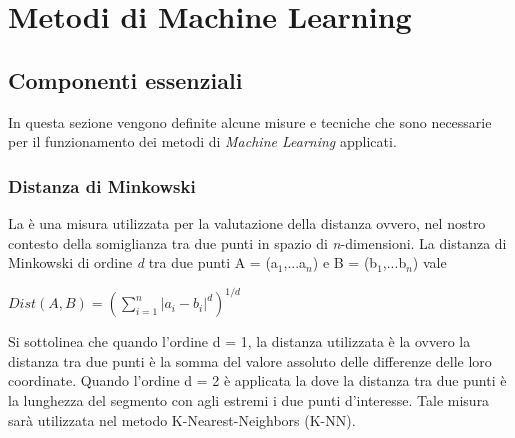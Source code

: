 
\chapter{Metodi di Machine Learning}
\label{cap:ML}
\section{Componenti essenziali}
In questa sezione vengono definite alcune misure e tecniche che sono necessarie per il funzionamento dei metodi di \emph{Machine Learning} applicati.
\subsection{Distanza di Minkowski}
La \textit{\cite{minkdist}} è una misura utilizzata per la valutazione della distanza ovvero, nel nostro contesto della somiglianza tra due punti in spazio di \textit{n}-dimensioni. La distanza di Minkowski di ordine \emph{d} tra due punti A = (a$_1$,...a$_n$) e B = (b$_1$,...b$_n$) vale
\begin{center}
	$Dist(A,B) =  \left(\sum_{i = 1}^{n}|a_i-b_i|^d\right)^{1/d} $
\end{center}

Si sottolinea che quando l'ordine d = 1, la distanza utilizzata è la \textit{\cite{manhattan}} ovvero la distanza tra due punti è la somma del valore assoluto delle differenze delle loro coordinate. Quando l'ordine d = 2 è applicata la \textit{\cite{euclidea}} dove la distanza tra due punti è la lunghezza del segmento con agli estremi i due punti d'interesse.
Tale misura sarà utilizzata nel metodo K-Nearest-Neighbors (K-NN).

